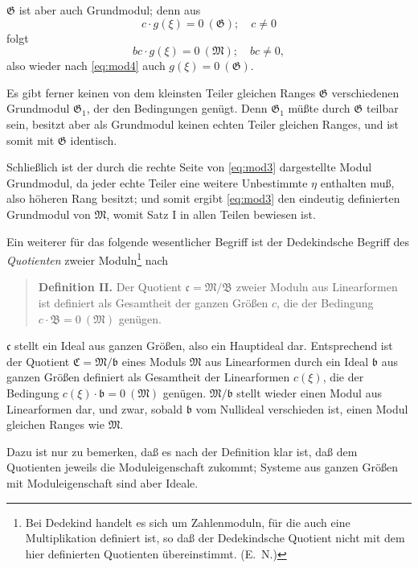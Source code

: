 \documentclass[fontsize=10pt,paper=a5,pagesize,headings=small]{scrbook}
\theoremstyle{plain}
\begin{document}
$\mathfrak{G}$ ist aber auch Grundmodul; denn aus
\[ c \cdot g(\xi) = 0\ (\mathfrak{G});\quad c \neq 0 \]
folgt
\[ bc \cdot g(\xi) = 0\ (\mathfrak{M});\quad bc \neq 0, \]
also wieder nach \eqref{eq:mod4} auch $g(\xi) = 0\ (\mathfrak{G})$.

Es gibt ferner keinen von dem kleinsten Teiler gleichen Ranges $\mathfrak{G}$ verschiedenen
Grundmodul $\mathfrak{G}_1$, der den Bedingungen genügt. Denn $\mathfrak{G}_1$ müßte durch $\mathfrak{G}$ teilbar sein,
besitzt aber als Grundmodul keinen echten Teiler gleichen Ranges, und ist somit mit
$\mathfrak{G}$ identisch.

Schließlich ist der durch die rechte Seite von \eqref{eq:mod3} dargestellte Modul
Grundmodul, da jeder echte Teiler eine weitere Unbestimmte $\eta$ enthalten muß, also
höheren Rang besitzt; und somit ergibt \eqref{eq:mod3} den eindeutig definierten
Grundmodul von $\mathfrak{M}$, womit Satz I in allen Teilen bewiesen ist.

\newpage
\setcounter{page}{427}

Ein weiterer für das folgende wesentlicher Begriff ist der Dedekindsche
Begriff des \textit{Quotienten} zweier Moduln\footnote{Bei Dedekind handelt es sich um Zahlenmoduln,
für die auch eine Multiplikation definiert ist, so daß der Dedekindsche Quotient nicht
mit dem hier definierten Quotienten übereinstimmt. (E.~N.)} nach

\begin{quote}
\textbf{Definition II.} Der Quotient $\mathfrak{c} = \mathfrak{M}/\mathfrak{B}$ zweier Moduln aus Linearformen ist definiert
als Gesamtheit der ganzen Größen $c$, die der Bedingung $c \cdot \mathfrak{B} = 0\ (\mathfrak{M})$
genügen.
\end{quote}

$\mathfrak{c}$ stellt ein Ideal aus ganzen Größen, also ein Hauptideal dar. Entsprechend ist der
Quotient $\mathfrak{C} = \mathfrak{M}/\mathfrak{b}$ eines Moduls $\mathfrak{M}$ aus Linearformen durch ein Ideal $\mathfrak{b}$ aus ganzen Größen
definiert als Gesamtheit der Linearformen $c(\xi)$, die der Bedingung $c(\xi) \cdot \mathfrak{b} = 0\ (\mathfrak{M})$
genügen. $\mathfrak{M}/\mathfrak{b}$ stellt wieder einen Modul aus Linearformen dar, und zwar, sobald $\mathfrak{b}$ vom
Nullideal verschieden ist, einen Modul gleichen Ranges wie $\mathfrak{M}$.

Dazu ist nur zu bemerken, daß es nach der Definition klar ist, daß dem Quotienten
jeweils die Moduleigenschaft zukommt; Systeme aus ganzen Größen mit Moduleigenschaft
sind aber Ideale.
\end{document}
